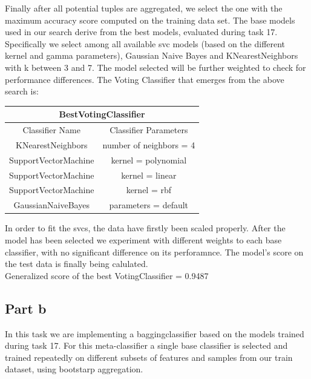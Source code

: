 \documentclass{article}
\begin{document}
    Finally after all potential tuples are aggregated, we select the one with the maximum accuracy score computed on the training data set.
    The base models used in our search derive from the best models, evaluated during task 17.
    Specifically we select among all available svc models (based on the different kernel and gamma parameters), Gaussian Naive Bayes and KNearestNeighbors with k between 3 and 7.
    The model selected will be further weighted to check for performance differences.
    The Voting Classifier that emerges from the above search is:
    \newpage

    \begin{table}[ht]
        \centering
        \begin{tabular}{| c | c |}
            \hline
            \multicolumn{2}{|c|}{BestVotingClassifier}\\
            \hline
            \rule{0pt}{4ex} \large Classifier Name & \large Classifier Parameters\\
            \hline
            KNearestNeighbors & number of neighbors = 4 \\ \hline
            SupportVectorMachine & kernel = polynomial \\ \hline
            SupportVectorMachine & kernel = linear \\ \hline
            SupportVectorMachine & kernel = rbf \\ \hline
            GaussianNaiveBayes  &  parameters = default \\ \hline
        \end{tabular}
    \end{table}
    In order to fit the svcs, the data have firstly been scaled properly.
    After the model has been selected we experiment with different weights to each base classifier, with no significant difference on its perforamnce.
    The model's score on the test data is finally being calulated.\\ 
    Generalized score of the best VotingClassifier = 0.9487


\subsection{Part b}
In this task we are implementing a baggingclassifier based on the models trained during task 17.
For this meta-classifier a single base classifier is selected and trained repeatedly on different subsets of features and samples from our train dataset, using bootstarp aggregation. 
\end{document}
